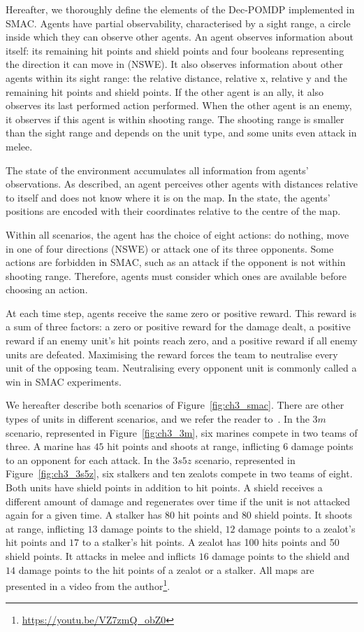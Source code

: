 Hereafter, we thoroughly define the elements of the Dec-POMDP implemented in SMAC.
Agents have partial observability, characterised by a sight range, a circle inside which they can observe other agents.
An agent observes information about itself: its remaining hit points and shield points and four booleans representing the direction it can move in (NSWE). 
It also observes information about other agents within its sight range: the relative distance, relative x, relative y and the remaining hit points and shield points. 
If the other agent is an ally, it also observes its last performed action performed.
When the other agent is an enemy, it observes if this agent is within shooting range.
The shooting range is smaller than the sight range and depends on the unit type, and some units even attack in melee.

The state of the environment accumulates all information from agents' observations.
As described, an agent perceives other agents with distances relative to itself and does not know where it is on the map.
In the state, the agents' positions are encoded with their coordinates relative to the centre of the map.

Within all scenarios, the agent has the choice of eight actions: do nothing, move in one of four directions (NSWE) or attack one of its three opponents.
Some actions are forbidden in SMAC, such as an attack if the opponent is not within shooting range.
Therefore, agents must consider which ones are available before choosing an action.

At each time step, agents receive the same zero or positive reward. 
This reward is a sum of three factors: a zero or positive reward for the damage dealt, a positive reward if an enemy unit's hit points reach zero, and a positive reward if all enemy units are defeated. Maximising the reward forces the team to neutralise every unit of the opposing team. Neutralising every opponent unit is commonly called a win in SMAC experiments.

We hereafter describe both scenarios of Figure~\ref{fig:ch3_smac}.
There are other types of units in different scenarios, and we refer the reader to~\citep{samvelyan2019starcraft}.
In the $3m$ scenario, represented in Figure~\ref{fig:ch3_3m}, six marines compete in two teams of three.
A marine has $45$ hit points and shoots at range, inflicting $6$ damage points to an opponent for each attack.
In the $3s5z$ scenario, represented in Figure~\ref{fig:ch3_3s5z}, six stalkers and ten zealots compete in two teams of eight.
Both units have shield points in addition to hit points.
A shield receives a different amount of damage and regenerates over time if the unit is not attacked again for a given time.
A stalker has $80$ hit points and $80$ shield points.
It shoots at range, inflicting $13$ damage points to the shield, $12$ damage points to a zealot's hit points and $17$ to a stalker's hit points.
A zealot has 100 hits points and 50 shield points.
It attacks in melee and inflicts $16$ damage points to the shield and $14$ damage points to the hit points of a zealot or a stalker.
All maps are presented in a video from the author\footnote{\url{https://youtu.be/VZ7zmQ_obZ0}}.

